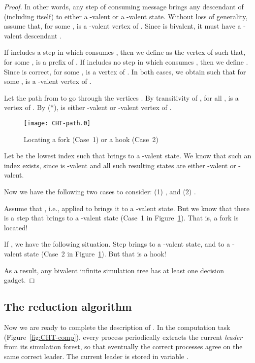 \documentclass[11pt]{article}
\begin{document}
\begin{proof}
In other words, any step of  consuming message  brings any descendant of 
	(including  itself) to either a -valent or a -valent state.
Without loss of generality, assume that, for some ,  is
	a -valent vertex of .
Since  is bivalent, it must have a -valent descendant .

If  includes a step in which  consumes , then we define 
	as the vertex of  such that, for some ,  is a prefix of .
If  includes no step in which  consumes , then we define .
Since  is correct, for some ,  is a vertex of .
In both cases, we obtain  such that for some ,
	 is a -valent vertex of .

Let the path from  to  go through the vertices
	.
By transitivity of , for all ,
	 is a vertex of .
By (*),  is either -valent or -valent
	vertex of .

\begin{figure}[htbp]
  \centering
  \texttt{[image: CHT-path.0]}
  \caption{Locating a fork (Case~1) or a hook (Case~2)}
  \label{fig:CHT-path}
\end{figure}

Let  be the lowest index such that  brings 
to a -valent state. We know that such an index exists, since   is -valent
and all such resulting states are either -valent or -valent.

Now we have the following two cases to consider: (1) , and (2) .

Assume that , i.e.,  applied to  brings it to a -valent state.
But we know that there is a step  that brings  to a -valent state
	(Case~1 in Figure~\ref{fig:CHT-path}).
That is, a fork is located!

If , we have the following situation.
Step  brings  to a -valent state,
	and  to a -valent state
	(Case~2 in Figure~\ref{fig:CHT-path}).
But that is a hook!
				
As a result, any bivalent infinite simulation tree has at least one decision gadget.
\end{proof}

\subsection{The reduction algorithm}
\label{subsec:cht:reduction}


Now we are ready to complete the description of .
In the computation task (Figure~\ref{fig:CHT-comp}), every process 
	periodically extracts the current \emph{leader} from its
	simulation forest, so that eventually
	the correct processes agree on the same correct leader.
The current leader is stored in variable .
\end{document}
